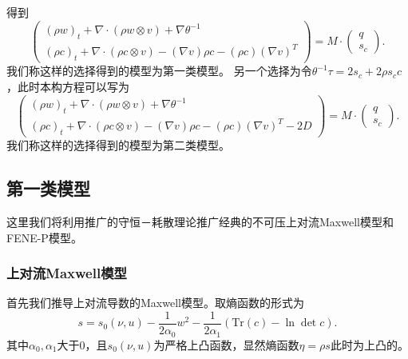 	得到
	\begin{equation} \label{eq:ECDFgeneral1}
		\left( \begin{array}{c} 
			(\rho w)_t +  \nabla \cdot (\rho w \otimes v)  + \nabla \theta^{-1} \\
			(\rho c)_t +  \nabla \cdot (\rho c \otimes v) - (\nabla v) \rho c - (\rho c) (\nabla v)^T 
		\end{array} \right) = M \cdot
		\left( \begin{array}{c} 
			q \\ s_c
		\end{array}\right).
	\end{equation}
	我们称这样的选择得到的模型为第一类模型。
	另一个选择为令$\theta^{-1} \tau = 2 s_c + 2 \rho s_c c$，此时本构方程可以写为
	\begin{equation}
	\left( \begin{array}{c} 
			(\rho w)_t +  \nabla \cdot (\rho w \otimes v)  + \nabla \theta^{-1} \\
			(\rho c)_t +  \nabla \cdot (\rho c \otimes v) - (\nabla v) \rho c - (\rho c) (\nabla v)^T - 2 D 
		\end{array} \right) = M \cdot
		\left( \begin{array}{c} 
			q \\ s_c
		\end{array}\right).	
	\end{equation}
	我们称这样的选择得到的模型为第二类模型。

	\subsection{第一类模型}
	这里我们将利用推广的守恒－耗散理论推广经典的不可压上对流Maxwell模型和FENE-P模型。
	\subsubsection{上对流Maxwell模型}
	首先我们推导上对流导数的Maxwell模型。取熵函数的形式为
	\begin{equation*}
			s = s_0(\nu,u)  - \frac{1}{2  \alpha_0} w^2 - \frac{1}{2  \alpha_1} (\mbox{Tr}(c) - \ln \det c).
	\end{equation*}
	其中$\alpha_0,\alpha_1$大于$0$，且$s_0(\nu,u)$为严格上凸函数，显然熵函数$\eta = \rho s$此时为上凸的。
	

